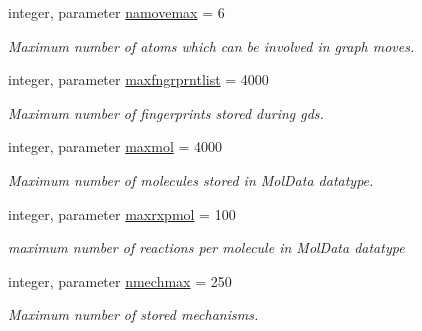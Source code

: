 \begin{DoxyCompactItemize}
integer, parameter \mbox{\hyperlink{namespaceconstants_ac336c2441f463ecd76d2c05ffe55420e}{namovemax}} = 6
\begin{DoxyCompactList}\small\item\em Maximum number of atoms which can be involved in graph moves. \end{DoxyCompactList}\item 
\mbox{\label{namespaceconstants_a8f28e62ecbb17961f4ef259b766e3383}} 
integer, parameter \mbox{\hyperlink{namespaceconstants_a8f28e62ecbb17961f4ef259b766e3383}{maxfngrprntlist}} = 4000
\begin{DoxyCompactList}\small\item\em Maximum number of fingerprints stored during gds. \end{DoxyCompactList}\item 
\mbox{\label{namespaceconstants_a3ad048dc0993f923d343e7200c8cdf6f}} 
integer, parameter \mbox{\hyperlink{namespaceconstants_a3ad048dc0993f923d343e7200c8cdf6f}{maxmol}} = 4000
\begin{DoxyCompactList}\small\item\em Maximum number of molecules stored in Mol\+Data datatype. \end{DoxyCompactList}\item 
\mbox{\label{namespaceconstants_aa47c951a801956aeef2f969ec9abdfae}} 
integer, parameter \mbox{\hyperlink{namespaceconstants_aa47c951a801956aeef2f969ec9abdfae}{maxrxpmol}} = 100
\begin{DoxyCompactList}\small\item\em maximum number of reactions per molecule in Mol\+Data datatype \end{DoxyCompactList}\item 
\mbox{\label{namespaceconstants_a57657a6eb79b285ab5c9849f1f82758f}} 
integer, parameter \mbox{\hyperlink{namespaceconstants_a57657a6eb79b285ab5c9849f1f82758f}{nmechmax}} = 250
\begin{DoxyCompactList}\small\item\em Maximum number of stored mechanisms. \end{DoxyCompactList}\item 
\mbox{\label{namespaceconstants_ae186692659283278757ea6ef58e5afbf}} 

\end{DoxyCompactItemize}
